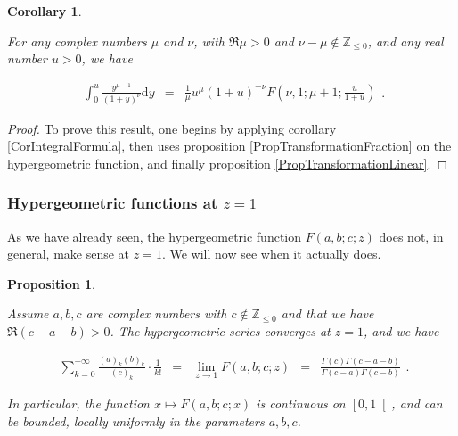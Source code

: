 \documentclass{jams-l}
\newtheorem{proposition}[theorem]{Proposition}
\newtheorem{corollary}[theorem]{Corollary}
\theoremstyle{definition}
\theoremstyle{remark}
\numberwithin{equation}{section}
\begin{document}
            \begin{corollary}
            \label{CorIntegralFormulaHypergeometric}
            
                For any complex numbers $\mu$ and $\nu$, with $\Re \mu > 0$ and $\nu - \mu \not \in \mathbb{Z}_{\leqslant 0}$, and any real number $u > 0$, we have
                
                \[ \begin{array}{lll}
                        \int_0^u \frac{y^{\mu-1}}{\left( 1 + y \right)^{\nu}} \mathrm{d}y & = & \frac{1}{\mu} u^{\mu} \left( 1 + u \right)^{-\nu} F \left( \nu, 1; \mu + 1; \frac{u}{1 + u} \right)
                    \end{array} . \]
            
            \end{corollary}
            
            \begin{proof}
            
                To prove this result, one begins by applying corollary \ref{CorIntegralFormula}, then uses proposition \ref{PropTransformationFraction} on the hypergeometric function, and finally proposition \ref{PropTransformationLinear}.
            
            \end{proof}
            
            
            
            
        \subsubsection{Hypergeometric functions at $z = 1$}
        
            As we have already seen, the hypergeometric function $F \left( a, b; c; z \right)$ does not, in general, make sense at $z = 1$. We will now see when it actually does.
        
            \begin{proposition}
            \label{PropHypergeometricZ1}
        
                Assume $a,b,c$ are complex numbers with $c \not \in \mathbb{Z}_{\leqslant 0}$ and that we have $\Re \left( c - a - b \right) > 0$. The hypergeometric series converges at $z = 1$, and we have
            
                \[ \begin{array}{lllll}
                        \sum\limits_{k=0}^{+ \infty} \frac{\left( a \right)_k \left( b \right)_k}{\left( c \right)_k} \cdot \frac{1}{k!} & = & \lim\limits_{z \rightarrow 1} F \left( a, b; c; z \right) & = & \frac{\Gamma \left( c \right) \Gamma \left( c - a - b \right)}{\Gamma \left( c - a \right) \Gamma \left( c - b \right)}
                    \end{array} . \]
            
                \noindent In particular, the function $x \longmapsto F \left( a, b; c; x \right)$ is continuous on $\left[ 0,1 \right[$, and can be bounded, locally uniformly in the parameters $a,b,c$.
        
            \end{proposition}
            
\end{document}

